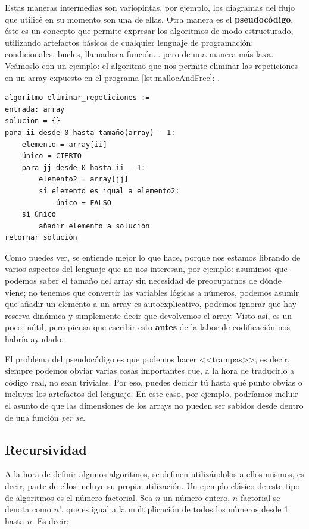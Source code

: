 \documentclass[a4paper]{article}
\begin{document}
Estas maneras intermedias son variopintas, por ejemplo, los diagramas del flujo
que utilicé en su momento son una de ellas. Otra manera es el
\textbf{pseudocódigo}, éste es un concepto que permite expresar los algoritmos
de modo estructurado, utilizando artefactos básicos de cualquier lenguaje de
programación: condicionales, bucles, llamadas a función... pero de una manera más
laxa. Veámoslo con un ejemplo: el algoritmo que nos permite eliminar las
repeticiones en un array expuesto en el programa \ref{lst:mallocAndFree}:
.

\begin{lstlisting}[style=pseudoCode]
algoritmo eliminar_repeticiones :=
entrada: array
solución = {}
para ii desde 0 hasta tamaño(array) - 1:
    elemento = array[ii]
    único = CIERTO
    para jj desde 0 hasta ii - 1:
        elemento2 = array[jj]
        si elemento es igual a elemento2:
            único = FALSO
    si único
        añadir elemento a solución
retornar solución
\end{lstlisting}

Como puedes ver, se entiende mejor lo que hace, porque nos estamos librando
de varios aspectos del lenguaje que no nos interesan, por ejemplo: asumimos
que podemos saber el tamaño del array sin necesidad de preocuparnos de dónde
viene; no tenemos que convertir las variables lógicas a números, podemos
asumir que añadir un elemento a un array es autoexplicativo, podemos ignorar
que hay reserva dinámica y simplemente decir que devolvemos el array. Visto
así, es un poco inútil, pero piensa que escribir esto \textbf{antes} de la
labor de codificación nos habría ayudado.

El problema del pseudocódigo es que podemos hacer <<trampas>>, es decir,
siempre podemos obviar varias cosas importantes que, a la hora de traducirlo a
código real, no sean triviales. Por eso, puedes decidir tú hasta qué punto
obvias o incluyes los artefactos del lenguaje. En este caso, por ejemplo,
podríamos incluir el asunto de que las dimensiones de los arrays no pueden
ser sabidos desde dentro de una función \textit{per se}.

\subsection{Recursividad}
A la hora de definir algunos algoritmos, se definen utilizándolos a ellos
mismos, es decir, parte de ellos incluye su propia utilización. Un ejemplo
clásico de este tipo de algoritmos es el número factorial. Sea $n$ un número
entero, $n$ factorial se denota como $n!$, que es igual a la multiplicación de
todos los números desde 1 hasta $n$. Es decir:
\end{document}
